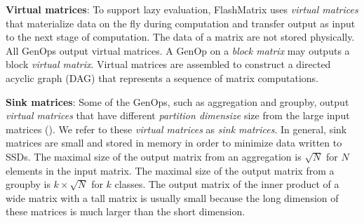 \noindent \textbf{Virtual matrices}:
To support lazy evaluation, FlashMatrix uses \textit{virtual matrices} that
materialize data on the fly during computation and transfer output as input to the
next stage of computation.  The data of a matrix are not stored physically.
All GenOps output virtual matrices. A GenOp on a \textit{block matrix} may outputs
a block \textit{virtual matrix}. Virtual matrices are assembled to construct
a directed acyclic graph (DAG) that represents a sequence of matrix computations.

\noindent \textbf{Sink matrices}: Some of the GenOps, such as aggregation and
groupby, output \textit{virtual
matrices} that have different \textit{partition dimensize} size from
the large input matrices (). We refer to these
\textit{virtual matrices} as \textit{sink matrices}. %
In general, sink matrices are small and stored in memory in order to minimize
data written to SSDs. The maximal size of the output matrix from an aggregation
is $\sqrt{N}$ for $N$ elements in the input matrix. The maximal size of
the output matrix from a groupby is $k \times \sqrt{N}$ for $k$ classes.
The output matrix of the inner product of a wide matrix with a tall matrix is usually small because
the long dimension of these matrices is much larger than the short dimension.


